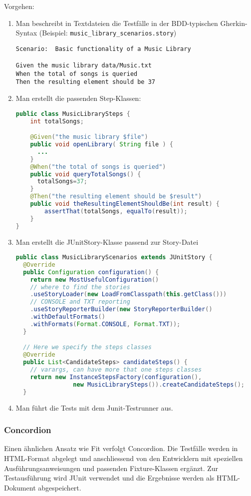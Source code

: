 Vorgehen:
\begin{enumerate}
\item Man beschreibt in Textdateien die Testfälle in der
BDD-typischen Gherkin-Syntax
  (Beispiel: \lstinline{music_library_scenarios.story})
\begin{lstlisting}[morekeywords={Given, When, And, Then}]
Scenario:  Basic functionality of a Music Library

Given the music library data/Music.txt
When the total of songs is queried
Then the resulting element should be 37
\end{lstlisting}
\newslide
\item Man erstellt die passenden Step-Klassen:
  \begin{lstlisting}[language=java]
public class MusicLibrarySteps {
    int totalSongs;

    @Given("the music library $file")
    public void openLibrary( String file ) {
      ...
    }
    @When("the total of songs is queried")
    public void queryTotalSongs() {
      totalSongs=37;
    }
    @Then("the resulting element should be $result")
    public void theResultingElementShouldBe(int result) {
    	assertThat(totalSongs, equalTo(result));
    }
}
  \end{lstlisting}
\item Man erstellt die JUnitStory-Klasse passend zur Story-Datei
  \begin{lstlisting}[language=java]
public class MusicLibraryScenarios extends JUnitStory {
  @Override
  public Configuration configuration() {
    return new MostUsefulConfiguration()
    // where to find the stories
    .useStoryLoader(new LoadFromClasspath(this.getClass()))
    // CONSOLE and TXT reporting
    .useStoryReporterBuilder(new StoryReporterBuilder()
    .withDefaultFormats()
    .withFormats(Format.CONSOLE, Format.TXT));
  }

  // Here we specify the steps classes
  @Override
  public List<CandidateSteps> candidateSteps() {
    // varargs, can have more that one steps classes
    return new InstanceStepsFactory(configuration(),
                new MusicLibrarySteps()).createCandidateSteps();
  }
  \end{lstlisting}
\item Man führt die Tests mit dem Junit-Testrunner aus.
\end{enumerate}
\newslide
\subsubsection{Concordion}
Einen ähnlichen Ansatz wie Fit verfolgt Concordion. Die Testfälle
werden in HTML-Format abgelegt und anschliessend von den
Entwicklern mit speziellen Ausführungsanweisungen und
passenden Fixture-Klassen ergänzt. Zur Testausführung wird
JUnit verwendet und die Ergebnisse werden als HTML-Dokument abgespeichert.

